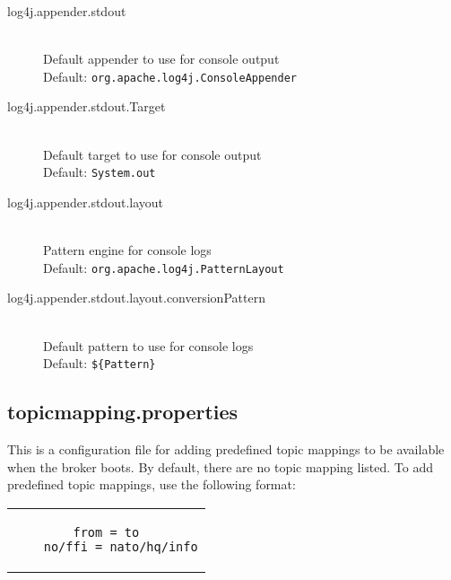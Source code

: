 \begin{description}
 \item[log4j.appender.stdout] \hfill \\
  Default appender to use for console output \hfill \\ Default: \verb!org.apache.log4j.ConsoleAppender!
   \item[log4j.appender.stdout.Target] \hfill \\
  Default target to use for console output \hfill \\ Default: \verb!System.out!
    \item[log4j.appender.stdout.layout] \hfill \\
  Pattern engine for console logs \hfill \\ Default: \verb!org.apache.log4j.PatternLayout!
   \item[log4j.appender.stdout.layout.conversionPattern] \hfill \\
  Default pattern to use for console logs \hfill \\ Default: \verb!${Pattern}!
  
 \end{description}
 
 \subsection{topicmapping.properties}
 \label{subsec:topicmapping.properties}
 
 This is a configuration file for adding predefined topic mappings to be available when the broker boots. By default, there are no topic mapping listed. To add predefined topic mappings, use the following format: 
 
 \begin{center}
\begin{tabular}{c}
\begin{lstlisting}[]
    from = to
    no/ffi = nato/hq/info
\end{lstlisting}
\end{tabular}
\end{center}

\clearpage